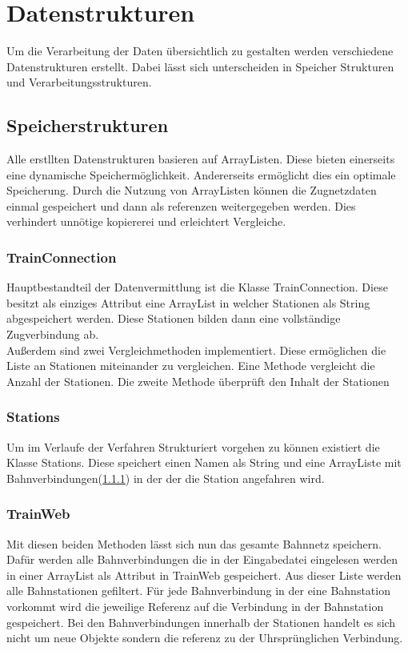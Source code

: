\section{Datenstrukturen}\label{ver:subsec:datenstrukturen}
Um die Verarbeitung der Daten übersichtlich zu gestalten werden verschiedene Datenstrukturen erstellt. Dabei lässt sich unterscheiden in Speicher Strukturen und Verarbeitungsstrukturen.\\
\subsection{Speicherstrukturen}\label{ver:subsec:Speicherstrukturen}
Alle erstllten Datenstrukturen basieren auf ArrayListen. Diese bieten einerseits eine dynamische Speichermöglichkeit. Andererseits ermöglicht dies ein optimale Speicherung. Durch die Nutzung von ArrayListen können die Zugnetzdaten einmal gespeichert und dann als referenzen weitergegeben werden. Dies verhindert unnötige kopiererei und erleichtert Vergleiche.\\

\subsubsection{TrainConnection}\label{ver:subsubsec:trainconnection}
Hauptbestandteil der Datenvermittlung ist die Klasse TrainConnection. Diese besitzt als einziges Attribut eine ArrayList in welcher Stationen als String abgespeichert werden. Diese Stationen bilden dann eine vollständige  Zugverbindung ab.\\

Außerdem sind zwei Vergleichmethoden implementiert. Diese ermöglichen die Liste an Stationen miteinander zu vergleichen. Eine Methode vergleicht die Anzahl der Stationen. Die zweite Methode überprüft den Inhalt der Stationen\\

\subsubsection{Stations}\label{ver:subsubsec:stations}
Um im Verlaufe der Verfahren Strukturiert vorgehen zu können existiert die Klasse Stations. Diese speichert einen Namen als String und eine ArrayListe mit Bahnverbindungen(\ref{ver:subsubsec:trainconnection}) in der der die Station angefahren wird.

\subsubsection{TrainWeb}\label{ver:subsubsec:trainweb}
Mit diesen beiden Methoden lässt sich nun das gesamte Bahnnetz speichern. Dafür werden alle Bahnverbindungen die in der Eingabedatei eingelesen werden in einer ArrayList als Attribut in TrainWeb gespeichert. Aus dieser Liste werden alle Bahnstationen gefiltert. Für jede Bahnverbindung in der eine Bahnstation vorkommt wird die jeweilige Referenz auf die Verbindung in der Bahnstation gespeichert. Bei den Bahnverbindungen innerhalb der Stationen handelt es sich nicht um neue Objekte sondern die referenz zu der Uhrsprünglichen Verbindung.\\


